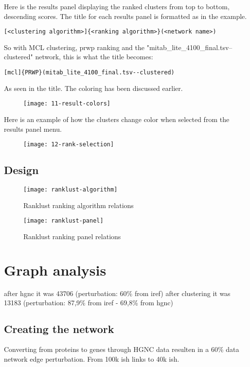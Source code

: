 Here is the results panel displaying the ranked clusters from top to bottom,
descending scores. The title for each results panel is formatted as in the
example.
\begin{Verbatim}[fontsize=\scriptsize]
[<clustering algorithm>]{<ranking algorithm>}(<network name>)
\end{Verbatim}
So with MCL clustering, \gls{prwp} ranking and the
"mitab\_lite\_4100\_final.tsv--clustered" network, this is what the title
becomes:
\begin{Verbatim}[fontsize=\scriptsize]
[mcl]{PRWP}(mitab_lite_4100_final.tsv--clustered)
\end{Verbatim}
As seen in the title. The coloring has been discussed earlier.
\begin{figure}[H]
    \label{fig:result-colors}
    \texttt{[image: 11-result-colors]}
\end{figure}

Here is an example of how the clusters change color when selected from the
results panel menu.
\begin{figure}[H]
    \label{fig:rank-selection}
    \texttt{[image: 12-rank-selection]}
\end{figure}

\section{Design}
\begin{figure}[H]
    \caption{Ranklust ranking algorithm relations}
    \label{fig:rank-alg}
    \texttt{[image: ranklust-algorithm]}
\end{figure}
\begin{figure}[H]
    \caption{Ranklust ranking panel relations}
    \label{fig:rank-panel}
    \texttt{[image: ranklust-panel]}
\end{figure}

\chapter{Graph analysis}
after hgnc it was 43706 (perturbation: 60\% from iref)
after clustering it was 13183 (perturbation: 87,9\% from iref - 69,8\% from hgnc) %

\section{Creating the network}
Converting from proteins to genes through HGNC data resulten in a 60\% data
network edge perturbation. From 100k ish links to 40k ish.

